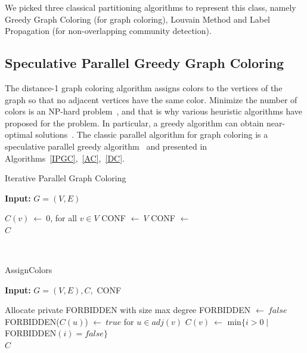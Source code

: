 \documentclass[default,iicol]{sn-jnl}%
\theoremstyle{thmstyleone}%
\theoremstyle{thmstyletwo}%
\theoremstyle{thmstylethree}%
\begin{document}
We picked three classical partitioning algorithms to represent this class, namely Greedy Graph 
Coloring (for graph coloring), Louvain Method and Label Propagation (for non-overlapping community detection).

\subsection{Speculative Parallel Greedy Graph Coloring}
\label{sec:pb-coloring}
The distance-1 graph coloring algorithm assigns colors to the vertices of the graph so that no adjacent vertices 
have the same color. Minimize the number of colors is an NP-hard problem~\cite{GareyJohnson79}, and that is why 
various heuristic algorithms have proposed for the problem. In particular, a greedy algorithm can obtain near-optimal 
solutions~\cite{matula1972graph}. The classic parallel algorithm for graph coloring is a speculative parallel greedy 
algorithm~\cite{Catalyurek12-ParCo,saule2012early} and presented in Algorithms~\ref{IPGC},~\ref{AC},~\ref{DC}.
\\
\begin{algorithm}
  \caption{Iterative Parallel Graph Coloring}\label{IPGC}
  \begin{flushleft}
  \textbf{Input: }$G=(V, E)$ 
  \end{flushleft}
  \begin{algorithmic}[1]
    \State $C(v)\ \leftarrow\ 0$, for all $v\in V$
    \State CONF $\leftarrow\ V$ 
    \State {}
    \State CONF $\leftarrow$ 
    \EndWhile \\
    \Return $C$
  \end{algorithmic}
\end{algorithm}
\\
\begin{algorithm}
  \caption{AssignColors}\label{AC}
  \begin{flushleft}
  \textbf{Input: }$G=(V, E), C, $ CONF 
  \end{flushleft}
  \begin{algorithmic}[1]
    \State Allocate private FORBIDDEN with size max degree
    \State FORBIDDEN $\leftarrow\ false$
    \State FORBIDDEN($C(u)$) $\leftarrow\ true$ for $u\in adj(v)$
    \State $C(v)\ \leftarrow$ min$\{i>0\mid$FORBIDDEN$(i)=false\}$
    \EndFor \\
    \Return $C$
  \end{algorithmic}
\end{algorithm}
\end{document}
